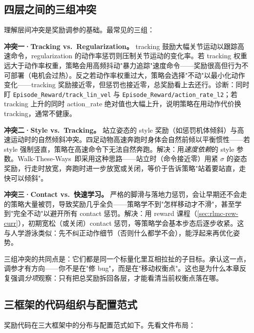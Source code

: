 \subsection{四层之间的三组冲突}
\label{sec:rlmc-rew-conflict}

理解层间冲突是奖励调参的基础。最常见的三组：

\textbf{冲突一·Tracking vs.\ Regularization。} tracking 鼓励大幅关节运动以跟踪高速命令，regularization 的动作率惩罚则压制关节运动的变化率。若 tracking 权重远大于动作率权重，策略会用高频抖动"暴力追踪"速度命令——奖励很高但行为不可部署（电机会过热）。反之若动作率权重过大，策略会选择"不动"以最小化动作变化——tracking 奖励接近零，但惩罚也接近零，总奖励看上去还行。诊断：同时盯 \verb|Episode_Reward/track_lin_vel| 与 \verb|Episode_Reward/action_rate_l2|；若 tracking 上升的同时 action\_rate 绝对值也大幅上升，说明策略在用动作代价换 tracking，通常不健康。

\textbf{冲突二·Style vs.\ Tracking。} 站立姿态的 style 奖励（如惩罚机体倾斜）与高速运动时的自然倾斜冲突。四足动物高速奔跑时身体会自然前倾以平衡惯性——若 style 强制竖直，策略在高速命令下无法自然奔跑。解决：用\emph{速度依赖}的 style 参数。Walk-These-Ways\,\cite{margolis2022walk} 即采用这种思路——站立时（命令接近零）用紧 $\sigma$ 的姿态奖励，行走时放宽，奔跑时进一步放宽或关闭，等价于告诉策略"站着要站直，走快可以倾斜"。

\textbf{冲突三·Contact vs.\ 快速学习。} 严格的脚滑与落地力惩罚，会让早期还不会走的策略大量被罚，导致奖励几乎全负——策略学不到"怎样移动才不滑"，甚至学到"完全不动"以避开所有 contact 惩罚。解决：用 reward 课程（\cref{sec:rlmc-rew-curr}），初期宽松（或关闭）contact 惩罚，等策略学会基本步态后逐步收紧。这与人学游泳类似：先不纠正动作细节（否则什么都学不会），能浮起来再优化姿势。

\begin{insight}\label{ins:rlmc-rew-pareto}
三组冲突的共同点是：它们都是同一个标量化里互相拉扯的子目标。承认这一点，调参才有方向——你不是在"修 bug"，而是在"移动权衡点"。这也是为什么本章反复强调\emph{分项}观察：只有把总奖励拆回各层，才能看清当前权衡点落在哪。
\end{insight}

\subsection{三框架的代码组织与配置范式}
\label{sec:rlmc-rew-codeorg}

奖励代码在三大框架中的分布与配置范式如下。先看文件布局：

